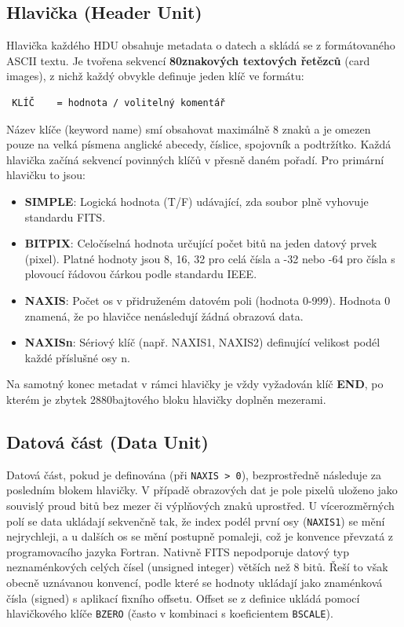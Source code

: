 \subsection{Hlavička (Header Unit)} Hlavička každého \ac{HDU} obsahuje metadata o datech a skládá se z formátovaného ASCII textu. Je tvořena sekvencí \textbf{80znakových textových řetězců} (card images), z nichž každý obvykle definuje jeden klíč ve formátu: \begin{verbatim} KLÍČ    = hodnota / volitelný komentář \end{verbatim} Název klíče (keyword name) smí obsahovat maximálně 8 znaků a je omezen pouze na velká písmena anglické abecedy, číslice, spojovník a podtržítko.
Každá hlavička začíná sekvencí povinných klíčů v přesně daném pořadí. Pro primární hlavičku to jsou: \begin{itemize} \item \textbf{SIMPLE}: Logická hodnota (T/F) udávající, zda soubor plně vyhovuje standardu \ac{FITS}. \item \textbf{BITPIX}: Celočíselná hodnota určující počet bitů na jeden datový prvek (pixel). Platné hodnoty jsou 8, 16, 32 pro celá čísla a -32 nebo -64 pro čísla s plovoucí řádovou čárkou podle standardu IEEE. \item \textbf{NAXIS}: Počet os v přidruženém datovém poli (hodnota 0-999). Hodnota 0 znamená, že po hlavičce nenásledují žádná obrazová data. \item \textbf{NAXISn}: Sériový klíč (např. NAXIS1, NAXIS2) definující velikost podél každé příslušné osy n. \end{itemize} Na samotný konec metadat v rámci hlavičky je vždy vyžadován klíč \textbf{END}, po kterém je zbytek 2880bajtového bloku hlavičky doplněn mezerami.\cite{fits_standard}
\subsection{Datová část (Data Unit)} Datová část, pokud je definována (při \texttt{NAXIS > 0}), bezprostředně následuje za posledním blokem hlavičky. V případě obrazových dat je pole pixelů uloženo jako souvislý proud bitů bez mezer či výplňových znaků uprostřed. U vícerozměrných polí se data ukládají sekvenčně tak, že index podél první osy (\texttt{NAXIS1}) se mění nejrychleji, a u dalších os se mění postupně pomaleji, což je konvence převzatá z programovacího jazyka Fortran.
Nativně \ac{FITS} nepodporuje datový typ neznaménkových celých čísel (unsigned integer) větších než 8 bitů. Řeší to však obecně uznávanou konvencí, podle které se hodnoty ukládají jako znaménková čísla (signed) s aplikací fixního offsetu. Offset se z definice ukládá pomocí hlavičkového klíče \texttt{BZERO} (často v kombinaci s koeficientem \texttt{BSCALE}).\cite{fits_standard}
